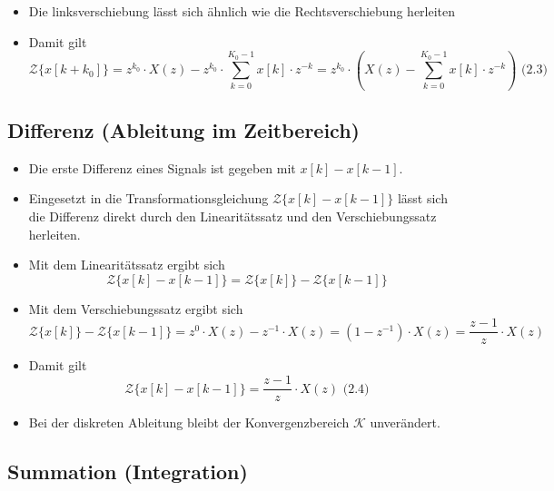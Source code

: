 \documentclass[11pt]{article}
\begin{document}
\begin{itemize}
\item
  Die linksverschiebung lässt sich ähnlich wie die Rechtsverschiebung
  herleiten
\item
  Damit gilt
  \[\mathcal{Z}\{x[k+k_0]\} = z^{k_0} \cdot X(z) - z^{k_0} \cdot \sum_{k=0}^{K_0-1}x[k] \cdot z^{-k} = z^{k_0} \cdot (X(z) - \sum_{k=0}^{K_0-1}x[k] \cdot z^{-k})\textrm{  (2.3)}\]
\end{itemize}

    \subsection{Differenz (Ableitung im
Zeitbereich)}\label{differenz-ableitung-im-zeitbereich}

\begin{itemize}
\item
  Die erste Differenz eines Signals ist gegeben mit \(x[k] - x[k-1]\).
\item
  Eingesetzt in die Transformationsgleichung
  \(\mathcal{Z}\{x[k] - x[k-1]\}\) lässt sich die Differenz direkt durch
  den Linearitätssatz und den Verschiebungssatz herleiten.
\item
  Mit dem Linearitätssatz ergibt sich
  \[\mathcal{Z}\{x[k] - x[k-1]\} = \mathcal{Z}\{x[k]\} - \mathcal{Z}\{x[k-1]\}\]
\item
  Mit dem Verschiebungssatz ergibt sich
  \[\mathcal{Z}\{x[k]\} - \mathcal{Z}\{x[k-1]\} = z^0 \cdot X(z) - z^{-1} \cdot X(z) = (1-z^{-1}) \cdot X(z) = \frac{z-1}{z} \cdot X(z)\]
\item
  Damit gilt
  \[\mathcal{Z}\{x[k] - x[k-1]\} = \frac{z-1}{z} \cdot X(z)\textrm{  (2.4)}\]
\item
  Bei der diskreten Ableitung bleibt der Konvergenzbereich
  \(\mathcal{K}\) unverändert.
\end{itemize}

    \subsection{Summation (Integration)}\label{summation-integration}
\end{document}
